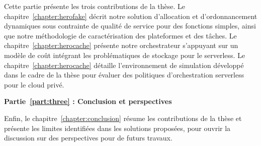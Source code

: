 Cette partie présente les trois contributions de la thèse. Le chapitre~\ref{chapter:herofake} décrit notre solution d'allocation et d'ordonnancement dynamiques sous contrainte de qualité de service pour des fonctions simples, ainsi que notre méthodologie de caractérisation des plateformes et des tâches. Le chapitre~\ref{chapter:herocache} présente notre orchestrateur s'appuyant sur un modèle de coût intégrant les problématiques de stockage pour le serverless. Le chapitre~\ref{chapter:herocache} détaille l'environnement de simulation développé dans le cadre de la thèse pour évaluer des politiques d'orchestration serverless pour le cloud privé.

\textbf{Partie~\ref{part:three} : Conclusion et perspectives}

Enfin, le chapitre~\ref{chapter:conclusion} résume les contributions de la thèse et présente les limites identifiées dans les solutions proposées, pour ouvrir la discussion sur des perspectives pour de futurs travaux.
